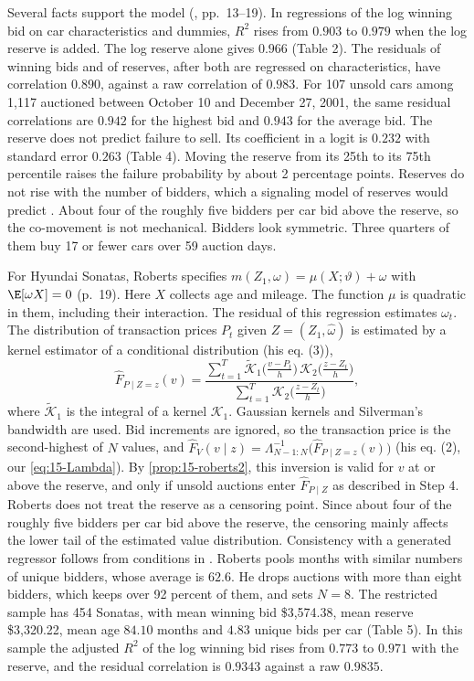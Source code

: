 Several facts support the model (\citealp{Roberts2013}, pp.~13--19). In regressions of the log
winning bid on car characteristics and dummies, $R^2$ rises from $0.903$ to $0.979$ when the log
reserve is added. The log reserve alone gives $0.966$ (Table 2). The residuals of winning bids and of
reserves, after both are regressed on characteristics, have correlation $0.890$, against a raw
correlation of $0.983$. For 107 unsold cars among 1,117 auctioned between October 10 and December 27,
2001, the same residual correlations are $0.942$ for the highest bid and $0.943$ for the average bid.
The reserve does not predict failure to sell. Its coefficient in a logit is $0.232$ with standard error
$0.263$ (Table 4). Moving the reserve from its 25th to its 75th percentile raises the failure
probability by about 2 percentage points. Reserves do not rise with the number of bidders, which a
signaling model of reserves would predict \citep{CaiRileyYe2007}. About four of the roughly five
bidders per car bid above the reserve, so the co-movement is not mechanical. Bidders look symmetric.
Three quarters of them buy 17 or fewer cars over 59 auction days.

For Hyundai Sonatas, Roberts specifies $m(Z_1,\omega)=\mu(X;\vartheta)+\omega$ with $\E[\omega X]=0$
(p.~19). Here $X$ collects age and mileage. The function $\mu$ is quadratic in them, including their
interaction. The residual of this regression estimates $\omega_t$. The distribution of transaction prices $P_t$ given
$Z=(Z_1,\hat\omega)$ is estimated by a kernel estimator of a conditional distribution (his eq. (3)),
\[
\hat F_{P\mid Z=z}(v)=\frac{\sum_{t=1}^T\tilde{\mathcal K}_1\big(\frac{v-P_t}{h}\big)\,\mathcal K_2\big(\frac{z-Z_t}{h}\big)}{\sum_{t=1}^T\mathcal K_2\big(\frac{z-Z_t}{h}\big)},
\]
where $\tilde{\mathcal K}_1$ is the integral of a kernel $\mathcal K_1$. Gaussian kernels and Silverman's
bandwidth are used. Bid increments are ignored, so the transaction price is the second-highest of $N$
values, and $\hat F_V(v\mid z)=\Lambda_{N-1:N}^{-1}\big(\hat F_{P\mid Z=z}(v)\big)$ (his eq. (2), our
\eqref{eq:15-Lambda}). By \cref{prop:15-roberts2}, this inversion is valid for $v$ at or above the
reserve, and only if unsold auctions enter $\hat F_{P\mid Z}$ as described in Step 4. Roberts does not
treat the reserve as a censoring point. Since about four of the roughly five bidders per car bid above
the reserve, the censoring mainly affects the lower tail of the estimated value distribution.
Consistency with a generated regressor follows from conditions in \citet{Matzkin2003}. Roberts pools months with similar numbers of unique bidders, whose average is
$62.6$. He drops auctions with more than eight bidders, which keeps over 92 percent of them, and sets
$N=8$. The restricted sample has 454 Sonatas, with mean winning bid \$3,574.38, mean reserve
\$3,320.22, mean age $84.10$ months and $4.83$ unique bids per car (Table 5). In this sample the
adjusted $R^2$ of the log winning bid rises from $0.773$ to $0.971$ with the reserve, and the residual
correlation is $0.9343$ against a raw $0.9835$.


